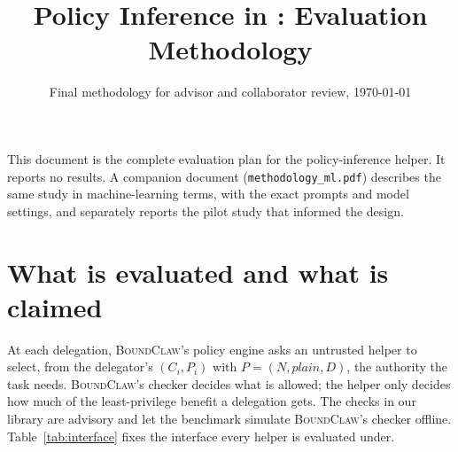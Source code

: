 \documentclass[10pt]{article}
\title{Policy Inference in \BC: Evaluation Methodology}
\date{Final methodology for advisor and collaborator review, \today}
\newcommand{\plain}{\mathit{plain}}
\newcommand{\BC}{{\mdseries\textsc{BoundClaw}}}
\begin{document}
\maketitle

\noindent This document is the complete evaluation plan for the policy-inference helper. It reports no results. A
companion document (\texttt{methodology\_ml.pdf}) describes the same study in machine-learning terms, with the exact
prompts and model settings, and separately reports the pilot study that informed the design.

\section{What is evaluated and what is claimed}\label{sec:interface}
At each delegation, \BC{}'s policy engine asks an untrusted helper to select, from the delegator's
$(C_i, P_i)$ with $P = (N, \plain, D)$, the authority the task needs. \BC{}'s checker decides what is allowed;
the helper only decides how much of the least-privilege benefit a delegation gets. The checks in our library
are advisory and let the benchmark simulate \BC{}'s checker offline. Table~\ref{tab:interface} fixes the
interface every helper is evaluated under.
\end{document}
